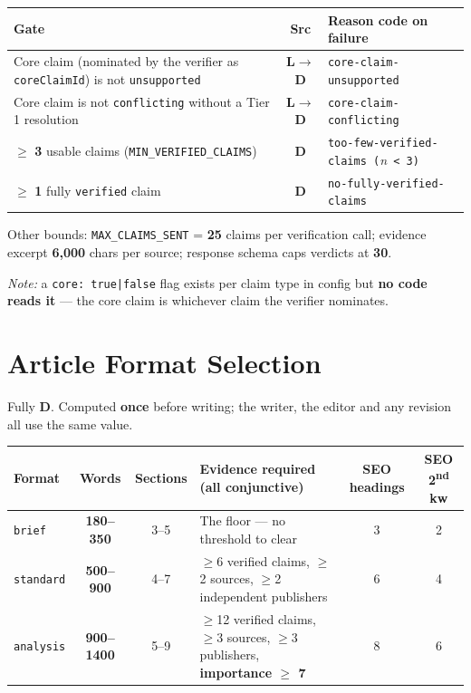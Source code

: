 \documentclass[10pt,a4paper]{article}
\newcommand{\cd}[1]{\texttt{\footnotesize\hyphenpenalty=0\exhyphenpenalty=0\relax #1}}
\newcommand{\us}{\_\discretionary{}{}{}}
\newcommand{\D}{\textcolor{go}{\textbf{D}}}
\newcommand{\LD}{\textcolor{hd}{\textbf{L$\rightarrow$D}}}
\begin{document}
\begin{center}\footnotesize
\begin{tabularx}{\textwidth}{@{}>{\RaggedRight}p{6.3cm} c >{\RaggedRight}X@{}}
\toprule
\textbf{Gate} & \textbf{Src} & \textbf{Reason code on failure} \\
\midrule
Core claim (nominated by the verifier as \cd{coreClaimId}) is not \cd{unsupported} & \LD & \cd{core-claim-unsupported} \\
Core claim is not \cd{conflicting} without a Tier 1 resolution & \LD & \cd{core-claim-conflicting} \\
$\geq$ \textbf{3} usable claims (\cd{MIN\us VERIFIED\us CLAIMS}) & \D & \cd{too-few-}\allowbreak\cd{verified-claims (}\textit{n}\cd{ < 3)} \\
$\geq$ \textbf{1} fully \cd{verified} claim & \D & \cd{no-fully-}\allowbreak\cd{verified-claims} \\
\bottomrule
\end{tabularx}
\end{center}

Other bounds: \cd{MAX\us CLAIMS\us SENT} = \textbf{25} claims per verification call; evidence excerpt \textbf{6{,}000} chars per source; response schema caps verdicts at \textbf{30}.

\textit{Note:} a \cd{core: true|false} flag exists per claim type in config but \textbf{no code reads it} --- the core claim is whichever claim the verifier nominates.

\section{Article Format Selection}

Fully \D. Computed \textbf{once} before writing; the writer, the editor and any revision all use the same value.

\begin{center}\footnotesize
\begin{tabularx}{\textwidth}{@{}l c c >{\RaggedRight}X c c@{}}
\toprule
\textbf{Format} & \textbf{Words} & \textbf{Sections} & \textbf{Evidence required (all conjunctive)} & \textbf{SEO headings} & \textbf{SEO 2\textsuperscript{nd} kw} \\
\midrule
\cd{brief} & \textbf{180--350} & 3--5 & The floor --- no threshold to clear & 3 & 2 \\
\cd{standard} & \textbf{500--900} & 4--7 & $\geq$6 verified claims, $\geq$2 sources, $\geq$2 independent publishers & 6 & 4 \\
\cd{analysis} & \textbf{900--1400} & 5--9 & $\geq$12 verified claims, $\geq$3 sources, $\geq$3 publishers, \textbf{importance $\geq$ 7} & 8 & 6 \\
\bottomrule
\end{tabularx}
\end{center}
\end{document}
